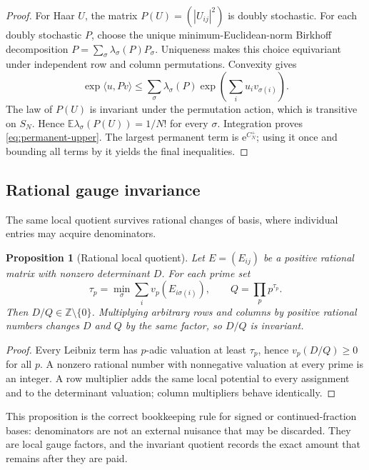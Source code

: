 \documentclass[11pt]{article}
\newcommand{\Z}{\mathbb Z}
\newcommand{\E}{\mathbb E}
\newcommand{\e}{\mathrm e}
\newcommand{\1}{\mathbf 1}
\theoremstyle{plain}
\newtheorem{proposition}[theorem]{Proposition}
\theoremstyle{definition}
\theoremstyle{remark}
\begin{document}
\begin{proof}
For Haar $U$, the matrix $P(U)=(|U_{ij}|^2)$ is doubly stochastic.  For each
doubly stochastic $P$, choose the unique minimum-Euclidean-norm Birkhoff
decomposition
$P=\sum_{\sigma}\lambda_\sigma(P)P_\sigma$.  Uniqueness makes this choice
equivariant under independent row and column permutations.  Convexity gives
\[
 \exp\langle u,Pv\rangle
 \le\sum_\sigma\lambda_\sigma(P)
       \exp\!\left(\sum_i u_iv_{\sigma(i)}\right).
\]
The law of $P(U)$ is invariant under the permutation action, which is
transitive on $S_N$.  Hence
$\E\lambda_\sigma(P(U))=1/N!$ for every $\sigma$.  Integration proves
\eqref{eq:permanent-upper}.  The largest permanent term is $\e^{C_N^+}$;
using it once and bounding all terms by it yields the final inequalities.
\end{proof}

\subsection{Rational gauge invariance}

The same local quotient survives rational changes of basis, where individual
entries may acquire denominators.

\begin{proposition}[Rational local quotient]\label{prop:rational-gauge}
Let $E=(E_{ij})$ be a positive rational matrix with nonzero determinant $D$.
For each prime set
\[
 \tau_p=\min_\sigma\sum_i v_p(E_{i\sigma(i)}),
 \qquad Q=\prod_pp^{\tau_p}.
\]
Then $D/Q\in\Z\setminus\{0\}$.  Multiplying arbitrary rows and columns by
positive rational numbers changes $D$ and $Q$ by the same factor, so $D/Q$ is
invariant.
\end{proposition}

\begin{proof}
Every Leibniz term has $p$-adic valuation at least $\tau_p$, hence
$v_p(D/Q)\ge0$ for all $p$.  A nonzero rational number with nonnegative
valuation at every prime is an integer.  A row multiplier adds the same local
potential to every assignment and to the determinant valuation; column
multipliers behave identically.
\end{proof}

This proposition is the correct bookkeeping rule for signed or
continued-fraction bases: denominators are not an external nuisance that may
be discarded.  They are local gauge factors, and the invariant quotient
records the exact amount that remains after they are paid.
\end{document}
